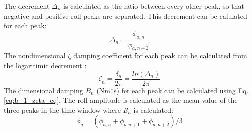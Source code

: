 The decrement $\Delta_n$ is calculated as the ratio between every
other peak, so that negative and positive roll peaks are separated. This
decrement can be calulated for each peak:
\begin{equation}
\Delta_n = \frac{\phi_{a,n}}{\phi_{a,n+2}}
\label{decrement}
\end{equation}
The nondimensional $\zeta$ damping coefficient for each peak can be
calculated from the logaritimic decrement \citep{7505983/BYNJ8CFG}:
\begin{equation}
\zeta_n = \frac{\delta_n}{2\pi}=\frac{ln(\Delta_n)}{2\pi}
\label{zeta_n}
\end{equation}
The dimensional damping $B_n$ (Nm*s) for each peak can be calculated
using Eq.\ref{eq:b_1_zeta_eq}.
The roll amplitude is calculated as the mean value of the three peaks in
the time window where $B_n$ is calculated:
\begin{equation}
\phi_a = (\phi_{a,n} + \phi_{a,n+1} + \phi_{a,n+2})/3
\label{phi_a}
\end{equation}
